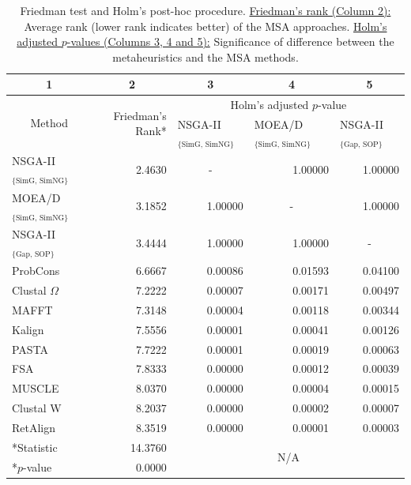 \begin{table}[!h]
	\scriptsize
	\centering
	\caption{Friedman test and Holm's post-hoc procedure. \underline{Friedman's rank (Column 2):} Average rank (lower rank indicates better) of the MSA approaches. \underline{Holm's adjusted $p$-values (Columns 3, 4 and 5):} Significance of difference between the metaheuristics and the MSA methods.}
	\begin{tabular}{|l|r||c|c|c|}
		\hline
		\multicolumn{1}{|c|}{1} & \multicolumn{1}{c||}{2} & 3     & 4     & 5 \\
		\hline
		\multicolumn{1}{|c|}{\multirow{2}{*}{Method}} & \multirow{2}{*}{Friedman's Rank*} & \multicolumn{3}{c|}{Holm's adjusted $p$-value} \\
		\cline{3-5}      &  & \multicolumn{1}{l|}{NSGA-II$_{\text{\{SimG, SimNG\}}}$} & \multicolumn{1}{l|}{MOEA/D$_{\text{\{SimG, SimNG\}}}$} & \multicolumn{1}{l|}{NSGA-II$_{\text{\{Gap, SOP\}}}$} \\
		\hline
		NSGA-II$_{\text{\{SimG, SimNG\}}}$ & 2.4630 & -     & \multicolumn{1}{r|}{1.00000} & \multicolumn{1}{r|}{1.00000} \\
		\hline
		MOEA/D$_{\text{\{SimG, SimNG\}}}$ & 3.1852 & \multicolumn{1}{r|}{1.00000} & -     &  \multicolumn{1}{r|}{1.00000} \\
		\hline
		NSGA-II$_{\text{\{Gap, SOP\}}}$ & 3.4444 & \multicolumn{1}{r|}{1.00000} &    \multicolumn{1}{r|}{1.00000}   & - \\
		\hline
		ProbCons & 6.6667 & \multicolumn{1}{r|}{0.00086} & \multicolumn{1}{r|}{0.01593} & \multicolumn{1}{r|}{0.04100} \\
		\hline
		Clustal $\Omega$ & 7.2222 & \multicolumn{1}{r|}{0.00007} & \multicolumn{1}{r|}{0.00171} & \multicolumn{1}{r|}{0.00497} \\
		\hline
		MAFFT & 7.3148 & \multicolumn{1}{r|}{0.00004} & \multicolumn{1}{r|}{0.00118} & \multicolumn{1}{r|}{0.00344} \\
		\hline
		Kalign & 7.5556 & \multicolumn{1}{r|}{0.00001} & \multicolumn{1}{r|}{0.00041} & \multicolumn{1}{r|}{0.00126} \\
		\hline
		PASTA & 7.7222 & \multicolumn{1}{r|}{0.00001} & \multicolumn{1}{r|}{0.00019} & \multicolumn{1}{r|}{0.00063} \\
		\hline
		FSA   & 7.8333 & \multicolumn{1}{r|}{0.00000} & \multicolumn{1}{r|}{0.00012} & \multicolumn{1}{r|}{0.00039} \\
		\hline
		MUSCLE & 8.0370 & \multicolumn{1}{r|}{0.00000} & \multicolumn{1}{r|}{0.00004} & \multicolumn{1}{r|}{0.00015} \\
		\hline
		Clustal W & 8.2037 & \multicolumn{1}{r|}{0.00000} & \multicolumn{1}{r|}{0.00002} & \multicolumn{1}{r|}{0.00007} \\
		\hline
		RetAlign & 8.3519 & \multicolumn{1}{r|}{0.00000} & \multicolumn{1}{r|}{0.00001} & \multicolumn{1}{r|}{0.00003} \\
		\hline
		\hline
		*Statistic & 14.3760 & \multicolumn{3}{c|}{\multirow{2}{*}{N/A}} \\
		\cline{1-2}    *$p$-value & 0.0000 & \multicolumn{3}{c|}{} \\
		\hline
	\end{tabular}\label{tab:friedman_holm}\end{table}
